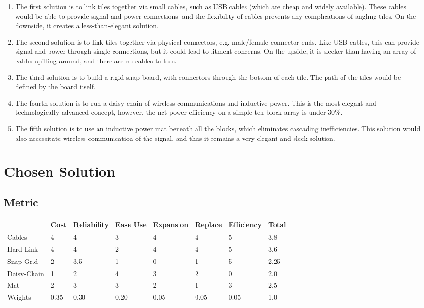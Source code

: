 \documentclass[12pt]{report}
\begin{document}
\begin{enumerate}

\item The first solution is to link tiles together via small cables, such as USB cables (which are cheap and widely available).  These cables would be able to provide signal and power connections, and the flexibility of cables prevents any complications of angling tiles.  On the downside, it creates a less-than-elegant solution.
\item The second solution is to link tiles together via physical connectors, e.g. male/female connector ends.  Like USB cables, this can provide signal and power through single connections, but it could lead to fitment concerns.  On the upside, it is sleeker than having an array of cables spilling around, and there are no cables to lose. 
\item The third solution is to build a rigid snap board, with connectors through the bottom of each tile.  The path of the tiles would be defined by the board itself.
\item The fourth solution is to run a daisy-chain of wireless communications and inductive power.  This is the most elegant and technologically advanced concept, however, the net power efficiency on a simple ten block array is under 30\%.
\item The fifth solution is to use an inductive power mat beneath all the blocks, which eliminates cascading inefficiencies.  This solution would also necessitate wireless communication of the signal, and thus it remains a very elegant and sleek solution.  

\end{enumerate}

\section*{Chosen Solution}

\subsection*{Metric}


\begin{minipage}{\linewidth}
\centering
{} \label{tab:grabber} 
\begin{tabular}{|l|l|l|l|l|l|l|l|}
\hline
 & Cost & Reliability & Ease Use & Expansion & Replace & Efficiency & Total \\
 \hline
 \rowcolor{green}
Cables & 4 & 4 & 3 & 4 & 4 & 5 & 3.8 \\
Hard Link & 4 & 4 & 2 & 4 & 4 & 5 & 3.6 \\
Snap Grid & 2 & 3.5 & 1 & 0 & 1 & 5 & 2.25 \\
Daisy-Chain & 1 & 2 & 4 & 3 & 2 & 0 & 2.0 \\
Mat & 2 & 3 & 3 & 2 & 1 & 3 & 2.5 \\
Weights & 0.35 & 0.30 & 0.20 & 0.05 & 0.05 & 0.05 & 1.0 \\
\hline
\end{tabular}
\end{minipage}
\end{document}
